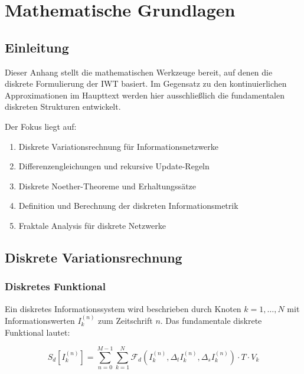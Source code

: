 
\chapter{Mathematische Grundlagen}
\label{app:mathematik}

\section{Einleitung}
\label{app:mathematik_einleitung}

Dieser Anhang stellt die mathematischen Werkzeuge bereit, auf denen die diskrete Formulierung der IWT basiert. Im Gegensatz zu den kontinuierlichen Approximationen im Haupttext werden hier ausschließlich die fundamentalen diskreten Strukturen entwickelt.

Der Fokus liegt auf:

\begin{enumerate}
    \item Diskrete Variationsrechnung für Informationsnetzwerke
    \item Differenzengleichungen und rekursive Update-Regeln
    \item Diskrete Noether-Theoreme und Erhaltungssätze
    \item Definition und Berechnung der diskreten Informationsmetrik
    \item Fraktale Analysis für diskrete Netzwerke
\end{enumerate}

\section{Diskrete Variationsrechnung}
\label{app:mathematik_varrechnung}

\subsection{Diskretes Funktional}
\label{sub:mathematik_funktional}

Ein diskretes Informationssystem wird beschrieben durch Knoten \( k = 1, \dots, N \) mit Informationswerten \( I_k^{(n)} \) zum Zeitschrift \( n \). Das fundamentale diskrete Funktional lautet:

\[
S_d \left[ I_k^{(n)} \right] = \sum_{n=0}^{M-1} \sum_{k=1}^{N} \mathcal{F}_d \left( I_k^{(n)}, \Delta_t I_k^{(n)}, \Delta_s I_k^{(n)} \right) \cdot T \cdot V_k
\]

